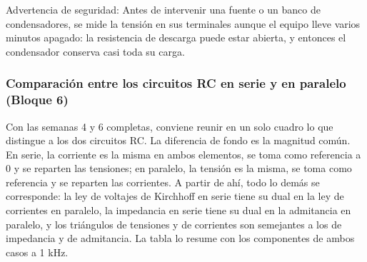 \documentclass[11pt,letterpaper]{article}
\begin{document}
\begin{nota}{Advertencia de seguridad:}
Antes de intervenir una fuente o un banco de condensadores, se mide la tensión en sus terminales aunque el equipo lleve varios minutos apagado: la resistencia de descarga puede estar abierta, y entonces el condensador conserva casi toda su carga.
\end{nota}

\subsubsection{Comparación entre los circuitos RC en serie y en paralelo (Bloque 6)}

Con las semanas 4 y 6 completas, conviene reunir en un solo cuadro lo que distingue a los dos circuitos RC. La diferencia de fondo es la magnitud común. En serie, la corriente es la misma en ambos elementos, se toma como referencia a 0\textdegree{} y se reparten las tensiones; en paralelo, la tensión es la misma, se toma como referencia y se reparten las corrientes. A partir de ahí, todo lo demás se corresponde: la ley de voltajes de Kirchhoff en serie tiene su dual en la ley de corrientes en paralelo, la impedancia en serie tiene su dual en la admitancia en paralelo, y los triángulos de tensiones y de corrientes son semejantes a los de impedancia y de admitancia. La tabla lo resume con los componentes de ambos casos a 1 kHz.
\end{document}
